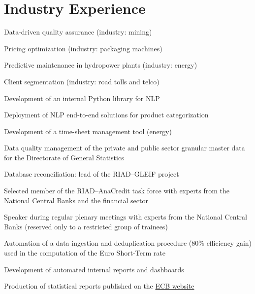 \documentclass[]{deedy-resume-reversed}
\begin{document}
\begin{minipage}[t]{0.60\textwidth}

\section{Industry Experience}

\begin{tightemize}
\item Data-driven quality assurance (industry: mining)
\item Pricing optimization (industry: packaging machines)
\item Predictive maintenance in hydropower plants (industry: energy)
\item Client segmentation (industry: road tolls and telco) 
\item Development of an internal Python library for NLP
\item Deployment of NLP end-to-end solutions for product categorization
\end{tightemize}
\sectionsep

\begin{tightemize}
\item Development of a time-sheet management tool (energy)
\end{tightemize}
\sectionsep

\begin{tightemize}
\item Data quality management of the private and public sector granular master data for the Directorate of General Statistics
\item Database reconciliation: lead of the RIAD–GLEIF project
\item Selected member of the RIAD–AnaCredit task force with experts from the National Central Banks and the financial sector
\item Speaker during regular plenary meetings with experts from the National Central Banks (reserved only to a restricted group of trainees)
\item Automation of a data ingestion and deduplication procedure (80\% efficiency gain) used in the computation of the Euro Short-Term rate
\item Development of automated internal reports and dashboards
\item Production of statistical reports published on the \href{https://www.ecb.europa.eu/stats/financial_corporations/list_of_financial_institutions/html/index.en.html}{ECB website}
\end{tightemize}
\sectionsep



\end{minipage}
\end{document}
